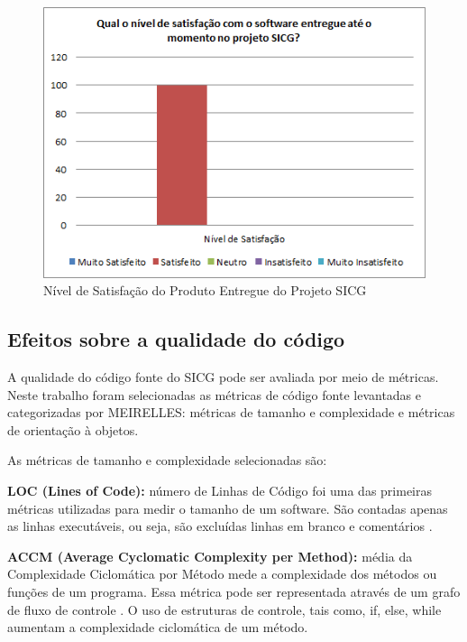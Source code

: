 \begin{figure}[H]
		\centering
			\includegraphics[scale=1.0]{figuras/satisfacao.png}
		\caption{Nível de Satisfação do Produto Entregue do Projeto SICG}
		\label{satisfacao}
\end{figure}

\subsection[Efeitos sobre a qualidade do código]{Efeitos sobre a qualidade do código}

A qualidade do código fonte do SICG pode ser avaliada por meio de métricas. Neste trabalho foram selecionadas as métricas de código fonte levantadas e categorizadas por MEIRELLES: métricas de tamanho e complexidade e métricas de orientação à objetos. 

As métricas de tamanho e complexidade selecionadas são: 

\textbf{LOC (Lines of Code):} número de Linhas de Código foi uma das primeiras métricas
utilizadas para medir o tamanho de um software. São contadas apenas as linhas
executáveis, ou seja, são excluídas linhas em branco e comentários \cite{Jones91}.

 \vspace{\onelineskip} 

\textbf{ACCM (Average Cyclomatic Complexity per Method):} média da Complexidade
Ciclomática por Método mede a complexidade dos métodos ou funções
de um programa. Essa métrica pode ser representada através de um grafo de fluxo
de controle \cite{McCabe76}. O uso de estruturas de controle, tais como, if, else,
while aumentam a complexidade ciclomática de um método.

